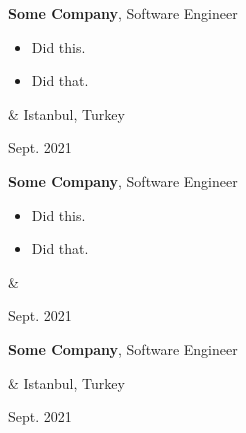 \documentclass[10pt, letterpaper]{article}
\newenvironment{highlights}{
        \begin{itemize}[
                topsep=0pt,
                parsep=0.10 cm,
                partopsep=0pt,
                itemsep=0pt,
                after=\vspace{-1\baselineskip},
                leftmargin=0.4 cm + 3pt
            ]
    }{
        \end{itemize}
    } %
\let\originalTabularx\tabularx
\let\originalEndTabularx\endtabularx
\renewenvironment{tabularx}{\bgroup\centering\originalTabularx}{\originalEndTabularx\par\egroup}
\begin{document}
        \vspace{0.2 cm}
        \begin{tabularx}{
            \textwidth-0.4 cm-0.13cm
        }{
            K{0.2 cm}
            R{4.1 cm}
        }
            \textbf{Some Company}, Software Engineer

            \vspace{0.10 cm}

            \begin{highlights}
                \item Did this.
                \item Did that.
            \end{highlights}
            &
            Istanbul, Turkey

            Sept. 2021
        \end{tabularx}

        \vspace{0.2 cm}
        \begin{tabularx}{
            \textwidth-0.4 cm-0.13cm
        }{
            K{0.2 cm}
            R{4.1 cm}
        }
            \textbf{Some Company}, Software Engineer

            \vspace{0.10 cm}

            \begin{highlights}
                \item Did this.
                \item Did that.
            \end{highlights}
            &
            

            Sept. 2021
        \end{tabularx}

        \vspace{0.2 cm}
        \begin{tabularx}{
            \textwidth-0.4 cm-0.13cm
        }{
            K{0.2 cm}
            R{4.1 cm}
        }
            \textbf{Some Company}, Software Engineer

            \vspace{0.10 cm}

            &
            Istanbul, Turkey

            Sept. 2021
        \end{tabularx}
\end{document}

